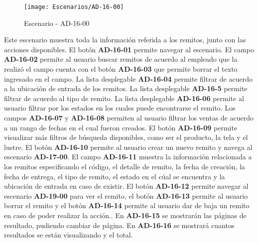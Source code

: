 \begin{figure}[H]
\centering
\texttt{[image: Escenarios/AD-16-00]}
\caption{Escenario - AD-16-00}
\label{fig:AD-16-00}
\end{figure}
Este escenario muestra toda la información referida a los remitos, junto con las acciones disponibles.
El botón \textbf{AD-16-01} permite navegar al escenario. El campo \textbf{AD-16-02} permite al usuario buscar remitos de acuerdo al empleado que la realizó el campo cuenta con el botón \textbf{AD-16-03} que permite borrar el texto ingresado en el campo. La lista desplegable \textbf{AD-16-04} permite filtrar de acuerdo a la ubicación de entrada de los remitos. La lista desplegable \textbf{AD-16-5} permite filtrar de acuerdo al tipo de remito. La lista desplegable \textbf{AD-16-06} permite al usuario filtrar por los estados en los cuales puede encontrarse el remito.  Los campos \textbf{AD-16-07} y \textbf{AD-16-08} permiten al usuario filtrar los ventas de acuerdo a un rango de fechas en el cual fueron creados. El botón \textbf{AD-16-09} permite visualizar más filtros de búsqueda disponibles, como ser el producto, la tela y el lustre.
El botón \textbf{AD-16-10} permite al usuario crear un nuevo remito y navega al escenario \textbf{AD-17-00}.
El campo \textbf{AD-16-11} muestra la información relacionada a los remitos especificando el código, el detalle de remito, la fecha de creación, la fecha de entrega, el tipo de remito, el estado en el cúal se encuentra y la ubicación de entrada en caso de existir. El botón \textbf{AD-16-12} permite navegar al escenario \textbf{AD-19-00} para ver el remito, el botón \textbf{AD-16-13} permite al usuario borrar el remito y el botón \textbf{AD-16-14} permite al usuario dar de baja un remito en caso de poder realizar la acción.. 
En \textbf{AD-16-15} se mostrarán las páginas de resultado, pudiendo cambiar de página. En \textbf{AD-16-16} se mostrará cuantos resultados se están visualizando y el total.
\clearpage
